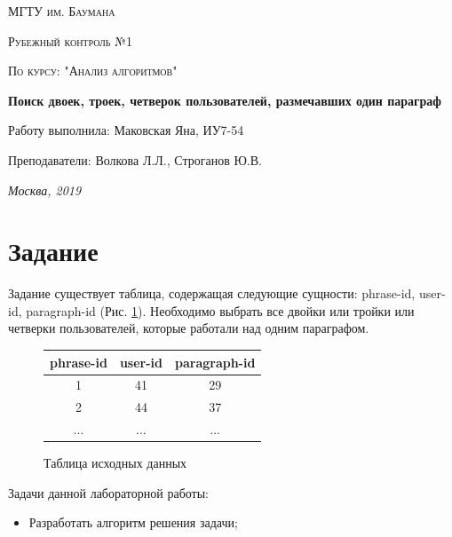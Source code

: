 \documentclass[12pt]{report}
\begin{document}
\begin{titlepage}
	\centering
	{\scshape\LARGE МГТУ им. Баумана \par}
	\vspace{3cm}
	{\scshape\Large Рубежный контроль №1\par}
	\vspace{0.5cm}	
	{\scshape\Large По курсу: "Анализ алгоритмов"\par}
	\vspace{1.5cm}
	{\huge\bfseries Поиск двоек, троек, четверок пользователей, размечавших один параграф\par}
	\vspace{2cm}
	\Large Работу выполнила: Маковская Яна, ИУ7-54\par
	\vspace{0.5cm}
	\Large Преподаватели:  Волкова Л.Л., Строганов Ю.В.\par

	\vfill
	\large \textit {Москва, 2019} \par
\end{titlepage}

\tableofcontents

\newpage
\chapter*{Задание}

Задание существует таблица, содержащая следующие сущности: phrase-id, user-id, paragraph-id (Рис. \ref{exp}). Необходимо выбрать все двойки или тройки или четверки пользователей, которые работали над одним параграфом.

\begin{figure}[h!]
	\begin{center}
		\begin{tabular}{|c c c|} 
			\hline
			phrase-id  & user-id & paragraph-id\\ [0.5ex] 
			\hline\hline
			1 & 41 & 29  \\
			\hline
			2 & 44 & 37\\
			\hline
			... & ... & ... \\
			\hline
		\end{tabular}
	\end{center}
	\caption{Таблица исходных данных}
	\label{exp}
\end{figure}

Задачи данной лабораторной работы:
\begin{itemize}
	\item Разработать алгоритм решения задачи;
\end{itemize}
\end{document}
